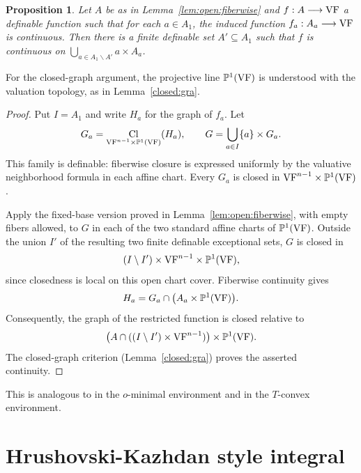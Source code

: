\documentclass[12pt]{amsart}
\theoremstyle{plain}
\newtheorem{prop}[thm]{Proposition}
\theoremstyle{definition}
\theoremstyle{remark}
\numberwithin{equation}{section}
\theoremstyle{plain}
\newcommand{\VF}{\textup{VF}}
\newcommand{\omin}{$o$\nobreakdash}
\newcommand{\T}{$T$\nobreakdash}
\newcommand{\0}{\emptyset}
\newcommand{\fun}{\longrightarrow}
\newcommand{\sub}{\subseteq}
\newcommand{\mi}{\smallsetminus}
\DeclareMathOperator{\Cl}{Cl}
\begin{document}
\begin{prop}\label{prop:continuity:fiberwise}
Let $A$ be as in Lemma~\ref{lem:open:fiberwise} and $f : A \fun \VF$  a definable function such that
for each $a \in A_1$, the induced function $f_a : A_a \fun \VF$ is continuous.
Then there is a finite definable set $A' \sub A_1$ such that $f$ is continuous on
$\bigcup_{a\in A_1 \mi A'} a \times A_a$.
\end{prop}

For the closed-graph argument, the projective line $\mathbb P^1(\VF)$ is understood with the valuation topology, as in Lemma~\ref{closed:gra}.

\begin{proof}
Put $I=A_1$ and write $H_a$ for the graph of $f_a$. Let
\[
G_a=\Cl_{\VF^{n-1}\times\mathbb P^1(\VF)}(H_a),\qquad
G=\bigcup_{a\in I}\{a\}\times G_a.
\]
This family is definable: fiberwise closure is expressed uniformly by the valuative neighborhood formula in each affine chart. Every $G_a$ is closed in $\VF^{n-1}\times\mathbb P^1(\VF)$.

Apply the fixed-base version proved in Lemma~\ref{lem:open:fiberwise}, with empty fibers allowed, to $G$ in each of the two standard affine charts of $\mathbb P^1(\VF)$. Outside the union $I'$ of the resulting two finite definable exceptional sets, $G$ is closed in
\[
(I\setminus I')\times\VF^{n-1}\times\mathbb P^1(\VF),
\]
since closedness is local on this open chart cover. Fiberwise continuity gives
\[
H_a=G_a\cap\bigl(A_a\times\mathbb P^1(\VF)\bigr).
\]
Consequently, the graph of the restricted function is closed relative to
\[
\bigl(A\cap((I\setminus I')\times\VF^{n-1})\bigr)\times\mathbb P^1(\VF).
\]
The closed-graph criterion (Lemma~\ref{closed:gra}) proves the asserted continuity.
\end{proof}


This is analogous to \cite[Corollary~6.2.4]{dries:1998} in the \omin-minimal environment and \cite[Lemma~2.38]{Yin:tcon:1.5} in the \T-convex environment.


\section{Hrushovski-Kazhdan style integral}\label{sec:HK:main}
\end{document}
